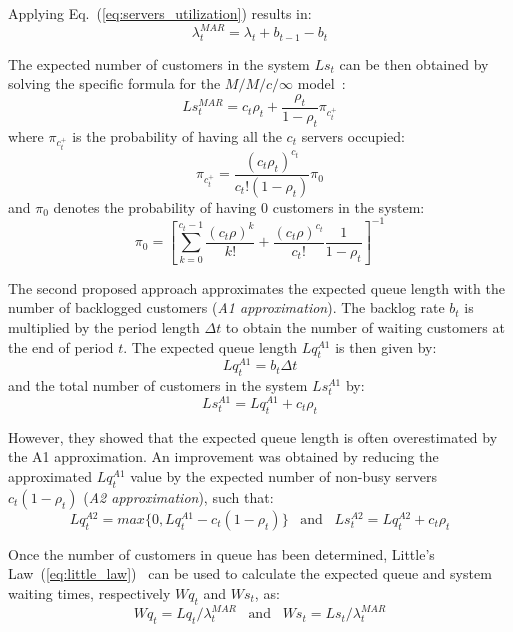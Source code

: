 Applying Eq.~(\ref{eq:servers_utilization}) results in:
\begin{equation}
  \lambda_t^{MAR} = \lambda_t + b_{t-1} - b_t
\end{equation}

The expected number of customers in the system \( Ls_t \) can be then obtained by solving the specific formula for the \( M/M/c/\infty \) model~\cite{kleinrock}:
\begin{equation}
  Ls_t^{MAR} = c_t\rho_t + \frac{\rho_t}{1-\rho_t} \pi_{c_t^+}
\end{equation}
where \( \pi_{c_t^+} \) is the probability of having all the \( c_t \) servers occupied:
\begin{equation}
  \pi_{c_t^+} = \frac{(c_t\rho_t)^{c_t}}{c_t!(1-\rho_t)}\pi_0
\end{equation}
and \( \pi_0 \) denotes the probability of having \( 0 \) customers in the system:
\begin{equation}
  \pi_0 = \left[ \sum_{k=0}^{c_t-1} \frac{(c_t\rho)^k}{k!} + \frac{(c_t\rho)^{c_t}}{c_t!} \frac{1}{1-\rho_t} \right]^{-1}
\end{equation}

The second proposed approach approximates the expected queue length with the number of backlogged customers (\emph{A1 approximation}). The backlog rate \( b_t \) is multiplied by the period length \( \Delta t \) to obtain the number of waiting customers at the end of period \( t \). The expected queue length \( Lq_t^{A1} \) is then given by:
\begin{equation}
  Lq_t^{A1} = b_t \Delta t
\end{equation}
and the total number of customers in the system \( Ls_t^{A1} \) by:
\begin{equation}
  Ls_t^{A1} = Lq_t^{A1} + c_t \rho_t
\end{equation}

However, they showed that the expected queue length is often overestimated by the A1 approximation. An improvement was obtained by reducing the approximated \( Lq_t^{A1} \) value by the expected number of non-busy servers \( c_t (1 - \rho_t) \) (\emph{A2 approximation}), such that:
\begin{equation}
  Lq_t^{A2} = max\{0, Lq_t^{A1} - c_t (1 - \rho_t)\}  \;\;\;\text{and}\;\;\;  Ls_t^{A2} = Lq_t^{A2} + c_t \rho_t
\end{equation}

Once the number of customers in queue has been determined, Little’s Law~(\ref{eq:little_law})~\cite{little} can be used to calculate the expected queue and system waiting times, respectively \( Wq_t \) and \( Ws_t \), as:
\begin{equation}
  Wq_t = Lq_t / \lambda^{MAR}_t  \;\;\;\text{and}\;\;\;  Ws_t = Ls_t / \lambda^{MAR}_t
\end{equation}

